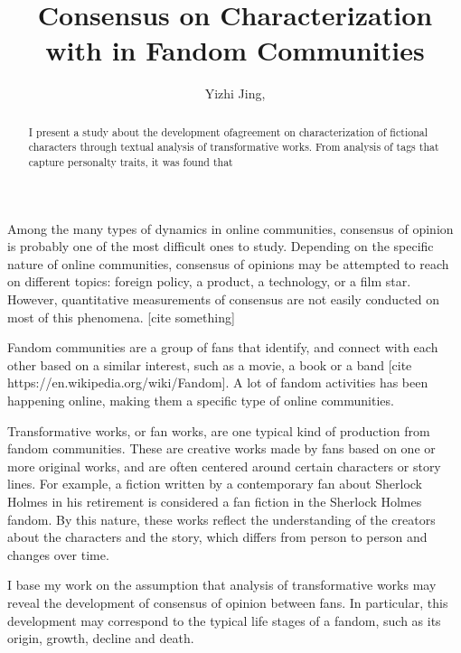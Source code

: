 \documentclass{pnastwo}
\begin{document}
\title{Consensus on Characterization with  in Fandom Communities}

\author{Yizhi Jing,
}


\maketitle

\begin{article}
\begin{abstract}
{I present a study about the development ofagreement on characterization of fictional characters through textual analysis of transformative works. From analysis of tags that capture personalty traits, it was found that }
\end{abstract}


Among the many types of dynamics in online communities, consensus of opinion is probably one of the most difficult ones to study. Depending on the specific nature of online communities, consensus of opinions may be attempted to reach on different topics: foreign policy, a product, a technology, or a film star. However, quantitative measurements of consensus are not easily conducted on most of this phenomena. [cite something]

Fandom communities are a group of fans that identify, and connect with each other based on a similar interest, such as a movie, a book or a band [cite https://en.wikipedia.org/wiki/Fandom]. A lot of fandom activities has been happening online, making them a specific type of online communities.

Transformative works, or fan works, are one typical kind of production from fandom communities. These are creative works made by fans based on one or more original works, and are often centered around certain characters or story lines. For example, a fiction written by a contemporary fan about Sherlock Holmes in his retirement is considered a fan fiction in the Sherlock Holmes fandom. By this nature, these works reflect the understanding of the creators about the characters and the story, which differs from person to person and changes over time.

I base my work on the assumption that analysis of transformative works may reveal the development of consensus of opinion between fans. In particular, this development may correspond to the typical life stages of a fandom, such as its origin, growth, decline and death. 


\end{article}
\end{document}

